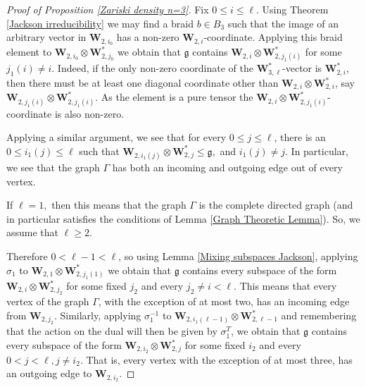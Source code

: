 \documentclass[letterpaper]{amsart}
\begin{document}
\begin{proof}[Proof of Proposition \ref{Zariski density n=3}]
    Fix $0 \leq i \leq \ell$. Using Theorem \ref{Jackson irreducibility} we may find a braid $b \in B_3$ such that the image of an arbitrary vector in $\textbf{W}_{2, i_0}$ has a non-zero $\textbf{W}_{2, i}$-coordinate. Applying this braid element to $\textbf{W}_{2, i_0} \otimes \textbf{W}_{2, j_0}^\ast$ we obtain that $\mathfrak{g}$ contains $\textbf{W}_{2, i} \otimes \textbf{W}_{2, j_1(i)}^\ast$ for some $j_1(i) \neq i.$ Indeed, if the only non-zero coordinate of the $\textbf{W}_{3,\ell}^\ast$-vector is $\textbf{W}_{2,i}^\ast$, then there must be at least one diagonal coordinate other than $\textbf{W}_{2, i} \otimes \textbf{W}_{2, i}^\ast$, say $\textbf{W}_{2, j_1(i)} \otimes \textbf{W}_{2, j_1(i)}^\ast$. As the element is a pure tensor the $\textbf{W}_{2, i} \otimes \textbf{W}_{2, j_1(i)}^\ast$-coordinate is also non-zero.
    
    Applying a similar argument, we see that for every $0 \leq j \leq \ell$, there is an $0 \leq i_1(j) \leq \ell$ such that $\textbf{W}_{2, i_1(j)} \otimes \textbf{W}_{2, j}^\ast \leq \mathfrak{g},$ and $i_1(j) \neq j.$ In particular, we see that the graph $\Gamma$ has both an incoming and outgoing edge out of every vertex.

    If $\ell = 1,$ then this means that the graph $\Gamma$ is the complete directed graph (and in particular satisfies the conditions of Lemma \ref{Graph Theoretic Lemma}). So, we assume that $\ell \geq 2.$

    Therefore $0 < \ell - 1 < \ell$, so using Lemma \ref{Mixing subspaces Jackson}, applying $\sigma_1$ to $\textbf{W}_{2, 1} \otimes \textbf{W}_{2, j_1(1)}^\ast$ we obtain that $\mathfrak{g}$ contains every subspace of the form $\textbf{W}_{2, i} \otimes \textbf{W}_{2, j_2}^\ast$ for some fixed $j_2$ and every $j_2 \neq i < \ell$. This means that every vertex of the graph $\Gamma$, with the exception of at most two, has an incoming edge from $\textbf{W}_{2, j_2}$. Similarly, applying $\sigma_1^{-1}$ to $\textbf{W}_{2, i_1(\ell - 1)} \otimes \textbf{W}_{2, \ell - 1}^\ast$ and remembering that the action on the dual will then be given by $\sigma_1^T$, we obtain that $\mathfrak{g}$ contains every subspace of the form $\textbf{W}_{2, i_2} \otimes \textbf{W}_{2, j}^\ast$ for some fixed $i_2$ and every $0 < j < \ell, j \neq i_2.$ That is, every vertex with the exception of at most three, has an outgoing edge to $\textbf{W}_{2, i_2}$.


\end{proof}
\end{document}
